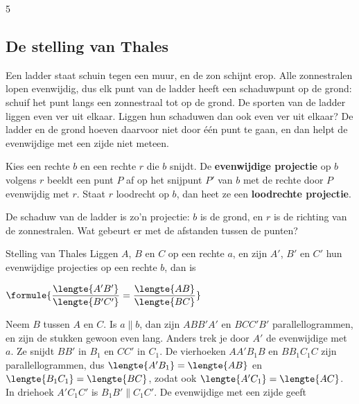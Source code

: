 \begin{alleenvoor}{5}
\subsection{De stelling van Thales}

Een ladder staat schuin tegen een muur, en de zon schijnt erop. Alle zonnestralen lopen evenwijdig, dus elk punt van de ladder heeft een schaduwpunt op de grond: schuif het punt langs een zonnestraal tot op de grond. De sporten van de ladder liggen even ver uit elkaar. Liggen hun schaduwen dan ook even ver uit elkaar? De ladder en de grond hoeven daarvoor niet door één punt te gaan, en dan helpt de evenwijdige met een zijde niet meteen.

\begin{theorie}
Kies een rechte $b$ en een rechte $r$ die $b$ snijdt. De \textbf{\textcolor{accent}{evenwijdige projectie}} op $b$ volgens $r$ beeldt een punt $P$ af op het snijpunt $P'$ van $b$ met de rechte door $P$ evenwijdig met $r$. Staat $r$ loodrecht op $b$, dan heet ze een \textbf{\textcolor{accent}{loodrechte projectie}}.
\end{theorie}

De schaduw van de ladder is zo'n projectie: $b$ is de grond, en $r$ is de richting van de zonnestralen. Wat gebeurt er met de afstanden tussen de punten?

\begin{theorie}
\begin{minipage}[t]{.56\linewidth}
\vspace{0pt}
\begin{stelling}{Stelling van Thales}
Liggen $A$, $B$ en $C$ op een rechte $a$, en zijn $A'$, $B'$ en $C'$ hun evenwijdige projecties op een rechte $b$, dan is

\vspace{1mm}
\qquad $\formule{\dfrac{\lengte{A'B'}}{\lengte{B'C'}} = \dfrac{\lengte{AB}}{\lengte{BC}}}$
\end{stelling}

\begin{bewijs}
Neem $B$ tussen $A$ en $C$. Is $a \parallel b$, dan zijn $ABB'A'$ en $BCC'B'$ parallellogrammen, en zijn de stukken gewoon even lang. Anders trek je door $A'$ de evenwijdige met $a$. Ze snijdt $BB'$ in $B_1$ en $CC'$ in $C_1$. De vierhoeken $AA'B_1B$ en $BB_1C_1C$ zijn parallellogrammen, dus $\lengte{A'B_1} = \lengte{AB}$ en $\lengte{B_1C_1} = \lengte{BC}$, zodat ook $\lengte{A'C_1} = \lengte{AC}$. In driehoek $A'C_1C'$ is $B_1B' \parallel C_1C'$. De evenwijdige met een zijde geeft


\end{bewijs}
\end{minipage}
\end{theorie}
\end{alleenvoor}
